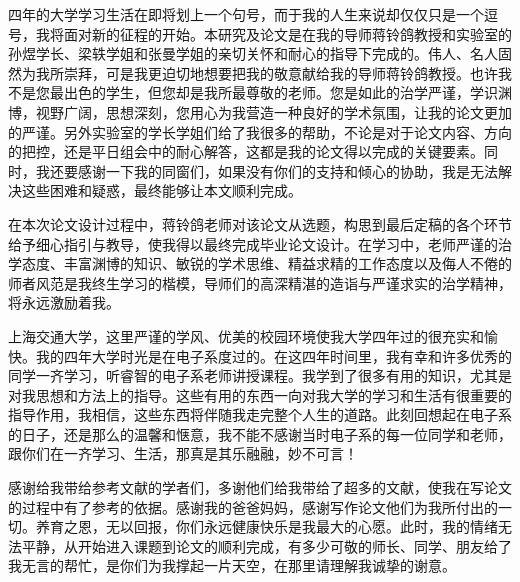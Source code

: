 \begin{thanks}

四年的大学学习生活在即将划上一个句号，而于我的人生来说却仅仅只是一个逗号，我将面对新的征程的开始。本研究及论文是在我的导师蒋铃鸽教授和实验室的孙煜学长、梁轶学姐和张曼学姐的亲切关怀和耐心的指导下完成的。伟人、名人固然为我所崇拜，可是我更迫切地想要把我的敬意献给我的导师蒋铃鸽教授。也许我不是您最出色的学生，但您却是我所最尊敬的老师。您是如此的治学严谨，学识渊博，视野广阔，思想深刻，您用心为我营造一种良好的学术氛围，让我的论文更加的严谨。另外实验室的学长学姐们给了我很多的帮助，不论是对于论文内容、方向的把控，还是平日组会中的耐心解答，这都是我的论文得以完成的关键要素。同时，我还要感谢一下我的同窗们，如果没有你们的支持和倾心的协助，我是无法解决这些困难和疑惑，最终能够让本文顺利完成。

在本次论文设计过程中，蒋铃鸽老师对该论文从选题，构思到最后定稿的各个环节给予细心指引与教导，使我得以最终完成毕业论文设计。在学习中，老师严谨的治学态度、丰富渊博的知识、敏锐的学术思维、精益求精的工作态度以及侮人不倦的师者风范是我终生学习的楷模，导师们的高深精湛的造诣与严谨求实的治学精神，将永远激励着我。

上海交通大学，这里严谨的学风、优美的校园环境使我大学四年过的很充实和愉快。我的四年大学时光是在电子系度过的。在这四年时间里，我有幸和许多优秀的同学一齐学习，听睿智的电子系老师讲授课程。我学到了很多有用的知识，尤其是对我思想和方法上的指导。这些有用的东西一向对我大学的学习和生活有很重要的指导作用，我相信，这些东西将伴随我走完整个人生的道路。此刻回想起在电子系的日子，还是那么的温馨和惬意，我不能不感谢当时电子系的每一位同学和老师，跟你们在一齐学习、生活，那真是其乐融融，妙不可言！

感谢给我带给参考文献的学者们，多谢他们给我带给了超多的文献，使我在写论文的过程中有了参考的依据。感谢我的爸爸妈妈，感谢写作论文他们为我所付出的一切。养育之恩，无以回报，你们永远健康快乐是我最大的心愿。此时，我的情绪无法平静，从开始进入课题到论文的顺利完成，有多少可敬的师长、同学、朋友给了我无言的帮忙，是你们为我撑起一片天空，在那里请理解我诚挚的谢意。
\end{thanks}